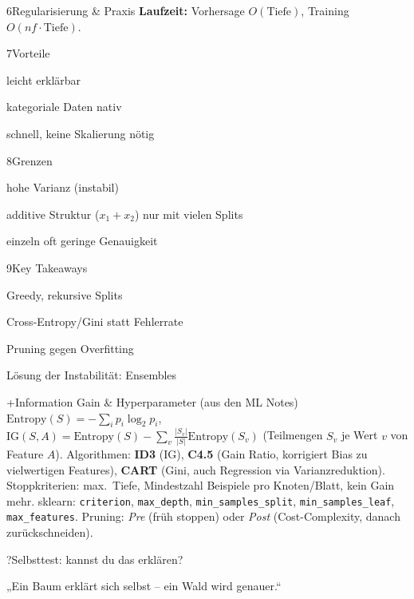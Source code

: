 \begin{hngrid}
\begin{hnp}[raster multicolumn=3,acc=hnrose]{6}{Regularisierung \& Praxis}
\textbf{Laufzeit:} Vorhersage $O(\text{Tiefe})$, Training $O(nf\cdot\text{Tiefe})$.
\end{hnp}
%
\begin{hnp}[raster multicolumn=2,acc=hngreen]{7}{Vorteile}
\begin{hnpro}
\item leicht erklärbar
\item kategoriale Daten nativ
\item schnell, keine Skalierung nötig
\end{hnpro}
\end{hnp}
%
\begin{hnp}[raster multicolumn=2,acc=hnred]{8}{Grenzen}
\begin{hncon}
\item hohe Varianz (instabil)
\item additive Struktur ($x_1{+}x_2$) nur mit vielen Splits
\item einzeln oft geringe Genauigkeit
\end{hncon}
\end{hnp}
%
\begin{hnp}[raster multicolumn=2,acc=hnorange]{9}{Key Takeaways}
\begin{hnchk}
\item Greedy, rekursive Splits
\item Cross-Entropy/Gini statt Fehlerrate
\item Pruning gegen Overfitting
\item Lösung der Instabilität: Ensembles
\end{hnchk}
\end{hnp}
%
\begin{hnp}[raster multicolumn=6,acc=hnteal]{+}{Information Gain \& Hyperparameter (aus den ML Notes)}
$\mathrm{Entropy}(S)=-\sum_ip_i\log_2p_i$, \;$\mathrm{IG}(S,A)=\mathrm{Entropy}(S)-\sum_{v}\frac{|S_v|}{|S|}\mathrm{Entropy}(S_v)$ (Teilmengen $S_v$ je Wert $v$ von Feature $A$). Algorithmen: \textbf{ID3} (IG), \textbf{C4.5} (Gain Ratio, korrigiert Bias zu vielwertigen Features), \textbf{CART} (Gini, auch Regression via Varianzreduktion). Stoppkriterien: max.\ Tiefe, Mindestzahl Beispiele pro Knoten/Blatt, kein Gain mehr. sklearn: \texttt{criterion}, \texttt{max\_depth}, \texttt{min\_samples\_split}, \texttt{min\_samples\_leaf}, \texttt{max\_features}. Pruning: \emph{Pre} (früh stoppen) oder \emph{Post} (Cost-Complexity, danach zurückschneiden).
\end{hnp}
%
\begin{hnp}[raster multicolumn=6,acc=hnpurple,colback=hnlilac!30]{?}{Selbsttest: kannst du das erklären?}
\end{hnp}
%
\begin{hnbanner}[raster multicolumn=6]
„Ein Baum erklärt sich selbst -- ein Wald wird genauer.“
\end{hnbanner}
\end{hngrid}
